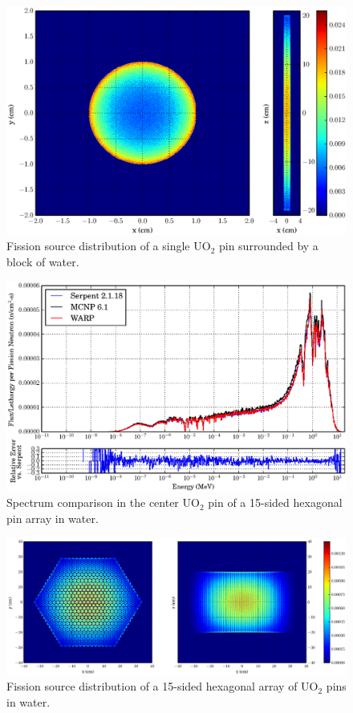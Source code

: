 \begin{figure}[h!]
\centering
\includegraphics[width=.75\textwidth]{graphics/finalresults/pincell_fiss-6.eps}
\caption{Fission source distribution of a single UO$_2$ pin surrounded by a block of water. \label{pincell_fiss} }
\end{figure}

\begin{figure}[h!] 
\centering
\includegraphics[width=\textwidth,trim= 1cm 0cm 1cm 0cm]{graphics/finalresults/assembly_spec-6.eps}
\caption{Spectrum comparison in the center UO$_2$ pin of a 15-sided hexagonal pin array in water. \label{assembly_spec} }
\end{figure}

\begin{figure}[h!]
\centering
\includegraphics[width=\textwidth,trim= 4cm 0cm 6cm 0cm]{graphics/finalresults/assembly_fiss-6.eps}
\caption{Fission source distribution of a 15-sided hexagonal array of UO$_2$ pins in water. \label{assembly_fiss} }
\end{figure}
	

